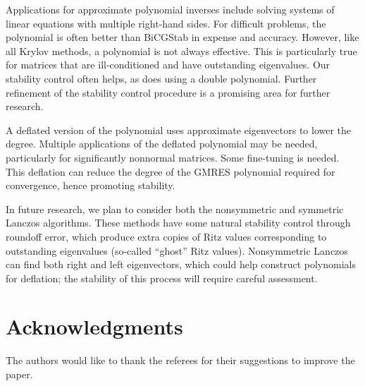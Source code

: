 \documentclass{siamart}
\begin{document}
Applications for approximate polynomial inverses include solving systems of linear equations with multiple right-hand sides.  For difficult problems, the polynomial is often better than BiCGStab in expense and accuracy.  However, like all Krylov methods, a polynomial is not always effective.  This is particularly true for matrices that are ill-conditioned and have outstanding eigenvalues.  Our stability control often helps, as does using a double polynomial.  Further refinement of the stability control procedure is a promising area for further research. 

A deflated version of the polynomial uses approximate eigenvectors to lower the degree.  Multiple applications of the deflated polynomial may be needed, particularly for significantly nonnormal matrices.  Some fine-tuning is needed. This deflation can reduce the degree of the GMRES polynomial required for convergence, hence promoting stability.

In future research, we plan to consider both the nonsymmetric and symmetric Lanczos algorithms.  These methods have some natural stability control through roundoff error, which produce extra copies of Ritz values corresponding to outstanding eigenvalues (so-called ``ghost'' Ritz values).  Nonsymmetric Lanczos can find both right and left eigenvectors, which could help construct polynomials for deflation; the stability of this process will require careful assessment.  
   
\section*{Acknowledgments} The authors would like to thank the referees for their suggestions to improve the paper.
\end{document}
